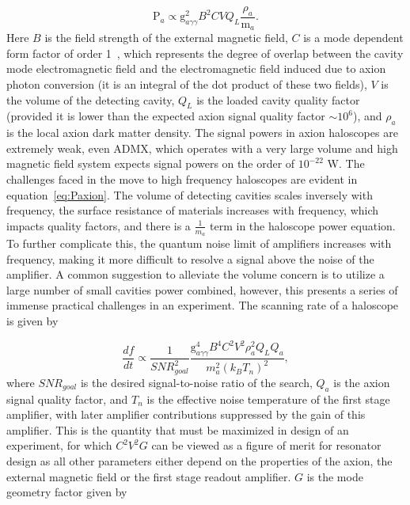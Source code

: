 \documentclass[preprint]{elsarticle}
\begin{document}
\begin{equation}
\text{P}_a\propto\text{g}_{a\gamma\gamma}^2B^2CVQ_L\frac{\rho_a}{\text{m}_a}.
\label{eq:Paxion}
\end{equation}
Here $B$ is the field strength of the external magnetic field, $C$ is a mode dependent form factor of order 1~\cite{McAllisterFormFactor}, which represents the degree of overlap between the cavity mode electromagnetic field and the electromagnetic field induced due to axion photon conversion (it is an integral of the dot product of these two fields), $V$ is the volume of the detecting cavity, $Q_L$ is the loaded cavity quality factor (provided it is lower than the expected axion signal quality factor $\sim10^6$), and $\rho_a$ is the local axion dark matter density. The signal powers in axion haloscopes are extremely weak, even ADMX, which operates with a very large volume and high magnetic field system expects signal powers on the order of $10^{-22}$ W. The challenges faced in the move to high frequency haloscopes are evident in equation~\ref{eq:Paxion}. The volume of detecting cavities scales inversely with frequency, the surface resistance of materials increases with frequency, which impacts quality factors, and there is a $\frac{1}{m_a}$ term in the haloscope power equation. To further complicate this, the quantum noise limit of amplifiers increases with frequency, making it more difficult to resolve a signal above the noise of the amplifier. A common suggestion to alleviate the volume concern is to utilize a large number of small cavities power combined, however, this presents a series of immense practical challenges in an experiment. The scanning rate of a haloscope is given by~\cite{Stern:2015kzo}

\begin{equation}
\frac{df}{dt}\propto\frac{1}{\textit{SNR}_{goal}^2}\frac{\text{g}_{a\gamma\gamma}^4B^4C^2V^2\rho_a^2Q_LQ_a}{m_a^2(k_BT_n)^2},
\end{equation}
where $\textit{SNR}_{goal}$ is the desired signal-to-noise ratio of the search, $Q_a$ is the axion signal quality factor, and $T_n$ is the effective noise temperature of the first stage amplifier, with later amplifier contributions suppressed by the gain of this amplifier. This is the quantity that must be maximized in design of an experiment, for which $C^2V^2G$ can be viewed as a figure of merit for resonator design as all other parameters either depend on the properties of the axion, the external magnetic field or the first stage readout amplifier. $G$ is the mode geometry factor given by
\end{document}
